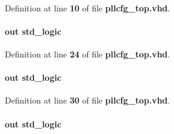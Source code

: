 \paragraph[{numeric\+\_\+std}]{\hspace{0.3cm}{\ttfamily [Package]}}\label{classpllcfg__top_a2edc34402b573437d5f25fa90ba4013e}


Definition at line {\bf 10} of file {\bf pllcfg\+\_\+top.\+vhd}.

\paragraph[{oenA}]{ {\bfseries \textcolor{keywordflow}{out}\textcolor{vhdlchar}{ }} {\bfseries \textcolor{comment}{std\+\_\+logic}\textcolor{vhdlchar}{ }} \hspace{0.3cm}{\ttfamily [Port]}}\label{classpllcfg__top_afa0766a50ad9e7f2dbaf411d49248d42}


Definition at line {\bf 24} of file {\bf pllcfg\+\_\+top.\+vhd}.

\paragraph[{oenB}]{ {\bfseries \textcolor{keywordflow}{out}\textcolor{vhdlchar}{ }} {\bfseries \textcolor{comment}{std\+\_\+logic}\textcolor{vhdlchar}{ }} \hspace{0.3cm}{\ttfamily [Port]}}\label{classpllcfg__top_aedc84dbd34bf048e192b116fc66d039a}


Definition at line {\bf 30} of file {\bf pllcfg\+\_\+top.\+vhd}.

\paragraph[{phcfg\+\_\+mode}]{ {\bfseries \textcolor{keywordflow}{out}\textcolor{vhdlchar}{ }} {\bfseries \textcolor{comment}{std\+\_\+logic}\textcolor{vhdlchar}{ }} \hspace{0.3cm}{\ttfamily [Port]}}\label{classpllcfg__top_afd7b55f414ed28c4644690c3fdcc37cc}


